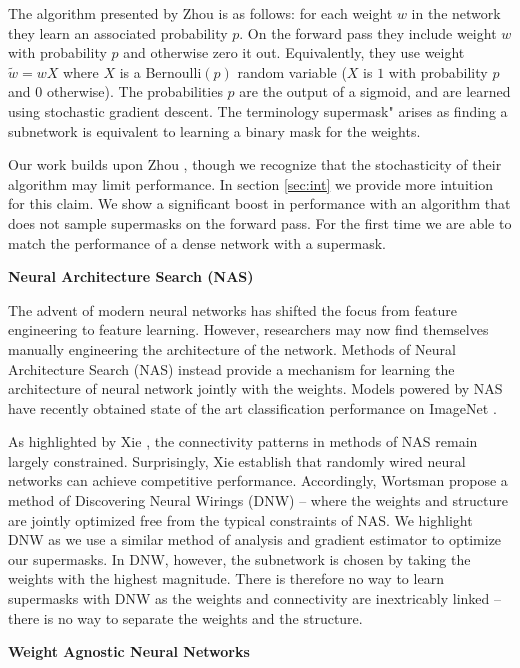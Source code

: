 \documentclass[10pt,twocolumn,letterpaper]{article}
\begin{document}
The algorithm presented by Zhou \etal is as follows: for each weight $w$ in the network they learn an associated probability $p$. On the forward pass they include weight $w$ with probability $p$ and otherwise zero it out. Equivalently, they use weight $\tilde w = w X$ where $X$ is a Bernoulli$(p)$ random variable ($X$ is $1$ with probability $p$ and $0$ otherwise). The probabilities $p$ are the output of a sigmoid, and are learned using stochastic gradient descent. The terminology supermask" arises as finding a subnetwork is equivalent to learning a binary mask for the weights.

Our work builds upon Zhou \etal, though we recognize that the stochasticity of their algorithm may limit performance. In section \ref{sec:int} we provide more intuition for this claim. We show a significant boost in performance with an algorithm that does not sample supermasks on the forward pass. For the first time we are able to match the performance of a dense network with a supermask.

\noindent\textbf{Neural Architecture Search (NAS)}

The advent of modern neural networks has shifted the focus from feature engineering to feature learning. However, researchers may now find themselves manually engineering the architecture of the network. Methods of Neural Architecture Search (NAS) \cite{nas, cai2018proxylessnas, liu2018progressive, mnasnet} instead provide a mechanism for learning the architecture of neural network jointly with the weights. Models powered by NAS have recently obtained state of the art classification performance on ImageNet \cite{efficientnet}.

As highlighted by Xie \etal \cite{xie2019exploring}, the connectivity patterns in methods of NAS remain largely constrained. Surprisingly, Xie \etal establish that randomly wired neural networks can achieve competitive performance. Accordingly, Wortsman \etal \cite{dnw} propose a method of Discovering Neural Wirings (DNW) -- where the weights and structure are jointly optimized free from the typical constraints of NAS. We highlight DNW as we use a similar method of analysis and gradient estimator to optimize our supermasks. In DNW, however, the subnetwork is chosen by taking the weights with the highest magnitude. There is therefore no way to learn supermasks with DNW as the weights and connectivity are inextricably linked -- there is no way to separate the weights and the structure.

\noindent\textbf{Weight Agnostic Neural Networks}
\end{document}
